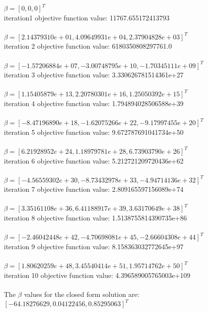 \documentclass[a4paper]{article}
\theoremstyle{definition}
\newenvironment{soln}{
    \leavevmode\color{blue}\ignorespaces
}{}
\begin{document}
\begin{enumerate}
\begin{soln}
$\beta = [0, 0, 0]^T$\\
iteration1 objective function value: 11767.655172413793\\
\\
$\beta = [2.14379310e+01, 4.09649931e+04, 2.37904828e+03]^T$\\
iteration 2 objective function value: 6180350808297761.0\\
\\
$\beta = [-1.57206884e+07, -3.00748795e+10, -1.70345111e+09]^T$\\
iteration 3 objective function value: 3.330626781514361e+27\\
\\
$\beta = [1.15405879e+13, 2.20780301e+16, 1.25050392e+15]^T$\\
iteration 4 objective function value: 1.794894028506588e+39\\
\\
$\beta = [-8.47196890e+18, -1.62075266e+22, -9.17997455e+20]^T$\\
iteration 5 objective function value: 9.672787691041734e+50\\
\\
$\beta = [6.21928952e+24, 1.18979781e+28, 6.73903790e+26]^T$\\
iteration 6 objective function value: 5.212721209720436e+62\\
\\
$\beta = [-4.56559302e+30, -8.73432978e+33, -4.94714136e+32]^T$\\
iteration 7 objective function value: 2.809165597156089e+74\\
\\
$\beta = [3.35161108e+36, 6.41188917e+39, 3.63170649e+38]^T$\\
iteration 8 objective function value: 1.5138755814390735e+86\\
\\
$\beta = [-2.46042448e+42, -4.70698081e+45, -2.66604308e+44]^T$\\
iteration 9 objective function value: 8.158363032772645e+97\\
\\
$\beta = [1.80620259e+48, 3.45540414e+51, 1.95714762e+50]^T$\\
iteration 10 objective function value: 4.396589005765003e+109\\
\\


The $\beta$ values for the closed form solution are:  $[-64.18276629, 0.04122456, 0.85295063]^T$\\


\end{soln}
\end{enumerate}
\end{document}
